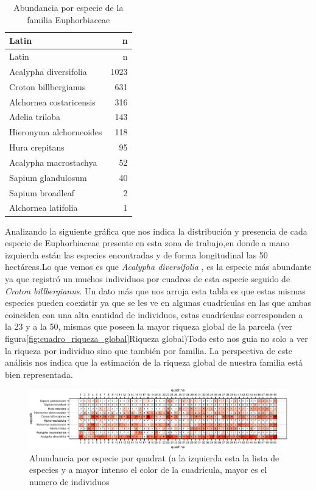 \documentclass[11pt,]{article}
\begin{document}
\begin{longtable}[]{@{}lr@{}}
\caption{\label{tab:tabla_de_abundancia}Abundancia por especie de la
familia Euphorbiaceae}\tabularnewline
\toprule
Latin & n\tabularnewline
\midrule
\endfirsthead
\toprule
Latin & n\tabularnewline
\midrule
\endhead
Acalypha diversifolia & 1023\tabularnewline
Croton billbergianus & 631\tabularnewline
Alchornea costaricensis & 316\tabularnewline
Adelia triloba & 143\tabularnewline
Hieronyma alchorneoides & 118\tabularnewline
Hura crepitans & 95\tabularnewline
Acalypha macrostachya & 52\tabularnewline
Sapium glandulosum & 40\tabularnewline
Sapium broadleaf & 2\tabularnewline
Alchornea latifolia & 1\tabularnewline
\bottomrule
\end{longtable}

Analizando la siguiente gráfica que nos indica la distribución y
presencia de cada especie de Euphorbiaceae presente en esta zona de
trabajo,en donde a mano izquierda están las especies encontradas y de
forma longitudinal las 50 hectáreas.Lo que vemos es que \emph{Acalypha
diversifolia} , es la especie más abundante ya que registró un muchos
individuos por cuadros de esta especie seguido de \emph{Croton
billbergianus}. Un dato más que nos arroja esta tabla es que estas
mismas especies pueden coexistir ya que se les ve en algunas cuadrículas
en las que ambas coinciden con una alta cantidad de individuos, estas
cuadrículas corresponden a la 23 y a la 50, mismas que poseen la mayor
riqueza global de la parcela (ver
figura\ref{fig:cuadro_riqueza_global}Riqueza global)Todo esto nos guia
no solo a ver la riqueza por individuo sino que también por familia. La
perspectiva de este análisis nos indica que la estimación de la riqueza
global de nuestra familia está bien representada.

\begin{figure}
\centering
\includegraphics{manuscrito_files/figure-latex/unnamed-chunk-3-1.pdf}
\caption{\label{fig:abun_sp_q}Abundancia por especie por quadrat (a la
izquierda esta la lista de especies y a mayor intenso el color de la
cuadricula, mayor es el numero de individuos}
\end{figure}
\end{document}
